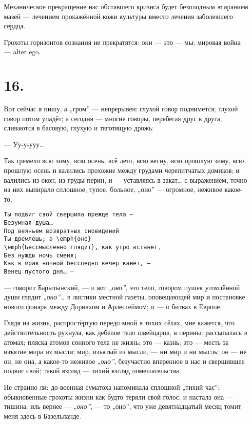 \documentclass[12pt,a4paper,oneside]{book}
\begin{document}
Механическое прекращение нас обставшего кризиса будет безплодным втиранием мазей — лечением прокажённой кожи культуры вместо лечения заболевшего сердца.

Грохоты горизонтов сознания не прекратятся: они — это — мы; мировая война — alter ego.

\section*{16.}

Вот сейчас я пишу, а „гром” — непрерывен: глухой говор поднимется; глухой говор потом упадёт; а сегодня — многие говоры, перебегая друг в друга, сливаются в басовую, глухую и тяготящую дрожь:

— Уу-у-ууу…

Так гремело всю зиму, всю осень, всё лето, всю весну, всю прошлую зиму, всю прошлую осень и валились прохожие между грудами черепитчатых домиков; и валились из окон, из груды перин, и — уставляясь в закат… с выражением, точно из них выпирало сплошное, тупое, больное, „оно” — огромное, неживое какое-то.

\begin{Verbatim}
Ты подвиг свой свершила прежде тела —
Безумная душа…
Под веяньем возвратных сновидений
Ты дремлешь; а \emph{оно}
\emph{Бессмысленно глядит}, как утро встанет,
Без нужды ночь сменя;
Как в мрак ночной бесследно вечер канет, —
Венец пустого дня… —
\end{Verbatim}

\hspace{0.45\textwidth}— говорит Барытынский, — и вот \emph{„оно”}, это тело, говором пушек утомлённой души глядит \emph{„оно”}… в листики местной газеты, оповещающей мир и постановке нового фонаря между Дорнахом и Арлесгеймом; и — о битвах в Европе.

Глядя на жизнь, распростёртую передо мной в тихих сёлах, мне кажется, что действительность рухнула, как дебелое тело швейцарца, в перины: рассыпалась в атомах; пляска атомов сонного тела не жизнь; это — казнь; это — месть за изъятие мира из мысли; мир, изъятый из мысли, — ни мир и ни мысль; он — не он, не она, а какое-то неживое \emph{„оно”}, безучастно вперенное в нас и свершившее подвиг свой; такой взгляд — тихий взгляд помешательства.

Не странно ли: до-военная суматоха напоминала сплошной „тихий час”; обыкновенные грохоты жизни как будто теряли свой голос: и настала она — тишина; иль вернее — \emph{„оно”}, — то „оно”, что уже девятнадцатый месяц томит меня здесь в Базельланде.
\end{document}
